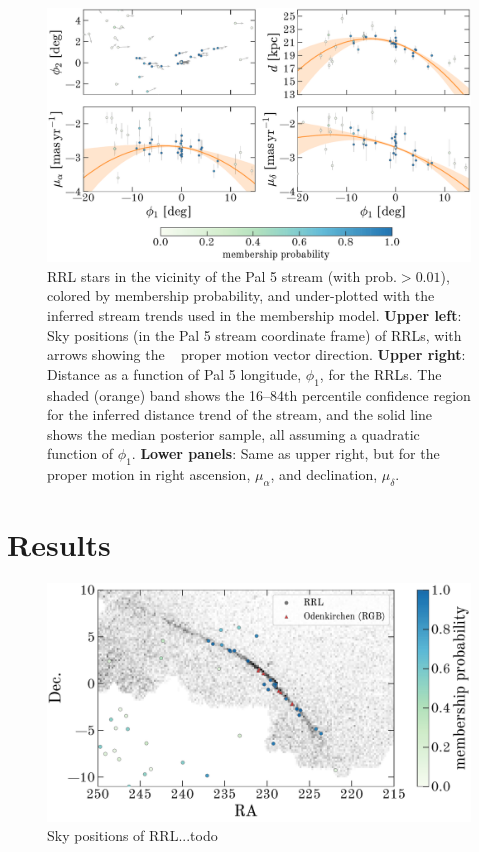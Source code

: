 \documentclass[twocolumn]{aastex63}
\begin{document}
\begin{figure}[t]
\begin{center}
\includegraphics[width=\textwidth]{tracks.pdf}
\caption{RRL stars in the vicinity of the Pal 5 stream (with $\textrm{prob.} > 0.01$), colored by membership probability, and under-plotted with the inferred stream trends used in the membership model.
\textbf{Upper left}: Sky positions (in the Pal 5 stream coordinate frame) of RRLs, with arrows showing the \Gaia\  proper motion vector direction.
\textbf{Upper right}: Distance as a function of Pal 5 longitude, $\phi_1$, for the RRLs. The shaded (orange) band shows the 16--84th percentile confidence region for the inferred distance trend of the stream, and the solid line shows the median posterior sample, all assuming a quadratic function of $\phi_1$.
\textbf{Lower panels}: Same as upper right, but for the proper motion in right ascension, $\mu_\alpha$, and declination, $\mu_\delta$.
}
\label{fig:trackmembers}
\end{center}
\end{figure}


\section{Results} \label{sec:results}

\begin{figure}[t]
\begin{center}
\includegraphics[width=\textwidth]{members.pdf}
\caption{Sky positions of RRL...todo}
\label{fig:members}
\end{center}
\end{figure}
\end{document}
